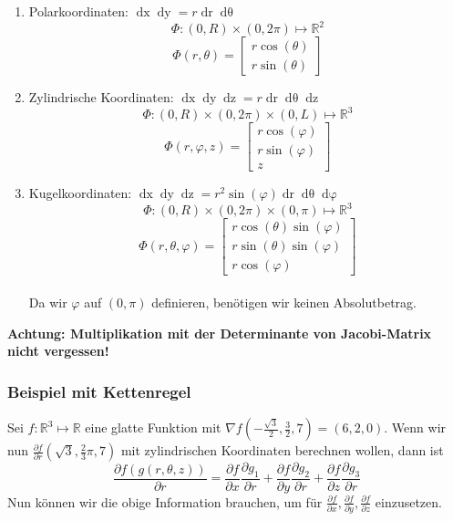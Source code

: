 \documentclass[a4paper,10pt]{article}
\def\R{\mathbb{R}}
\begin{document}
\begin{enumerate}
  \item{
    Polarkoordinaten: \(\mathop{dx}\mathop{dy} = r \mathop{dr} \mathop{d\theta}\)\\
    $$\varPhi: (0, R) \times (0, 2\pi) \mapsto \R^2$$
    $$\varPhi(r, \theta) = \begin{bmatrix}
      r \cos(\theta) \\
      r \sin(\theta)
    \end{bmatrix}$$
  }
  \item{
    Zylindrische Koordinaten: \(\mathop{dx} \mathop{dy} \mathop{dz} = r \mathop{dr} \mathop{d\theta} \mathop{dz}\)\\
    $$\varPhi: (0, R) \times (0, 2\pi) \times (0, L) \mapsto \R^3$$
    $$\varPhi(r, \varphi, z) = \begin{bmatrix}
      r \cos(\varphi) \\
      r \sin(\varphi) \\
      z
    \end{bmatrix}$$
  }
  \item{
    Kugelkoordinaten: \(\mathop{dx}\mathop{dy}\mathop{dz} = r^2 \sin(\varphi) \mathop{dr} \mathop{d\theta} \mathop{d\varphi}\)\\
    $$\varPhi: (0, R) \times (0, 2\pi) \times (0, \pi) \mapsto \R^3$$
    $$\varPhi(r, \theta, \varphi) = \begin{bmatrix}
      r \cos(\theta) \sin(\varphi) \\
      r \sin(\theta) \sin(\varphi) \\
      r \cos(\varphi)
    \end{bmatrix}$$\\
    Da wir $\varphi$ auf $(0, \pi)$ definieren, benötigen wir keinen Absolutbetrag.
  }
\end{enumerate}

\textbf{Achtung: Multiplikation mit der Determinante von Jacobi-Matrix nicht vergessen!}

\subsubsection*{Beispiel mit Kettenregel}
Sei \(f: \R^3 \mapsto \R\) eine glatte Funktion mit \(\nabla f \left(-\frac{\sqrt{3}}{2}, \frac{3}{2},7\right) = (6,2,0)\). Wenn wir nun \(\frac{\partial f}{\partial r}\left(\sqrt{3}, \frac{2}{3}\pi, 7\right)\) mit zylindrischen Koordinaten berechnen wollen, dann ist
\[\frac{\partial f(g(r,\theta,z))}{\partial r} = \frac{\partial f}{\partial x} \frac{\partial g_1}{\partial r} + \frac{\partial f}{\partial y} \frac{\partial g_2}{\partial r} + \frac{\partial f}{\partial z} \frac{\partial g_3}{\partial r}\]
Nun können wir die obige Information brauchen, um für \(\frac{\partial f}{\partial x}, \frac{\partial f}{\partial y}, \frac{\partial f}{\partial z}\) einzusetzen.
\end{document}
